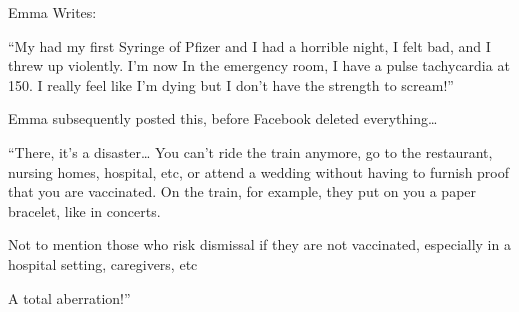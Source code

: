 Emma Writes:

“My had my first Syringe of Pfizer and I had a horrible night, I felt bad, and I
threw up violently. I’m now In the emergency room, I have a pulse tachycardia at
150. I really feel like I’m dying but I don’t have the strength to scream!”

Emma subsequently posted this, before Facebook deleted everything…

“There, it’s a disaster… You can’t ride the train anymore, go to the restaurant,
nursing homes, hospital, etc, or attend a wedding without having to furnish
proof that you are vaccinated. On the train, for example, they put on you a
paper bracelet, like in concerts.

Not to mention those who risk dismissal if they are not vaccinated, especially
in a hospital setting, caregivers, etc

A total aberration!”


